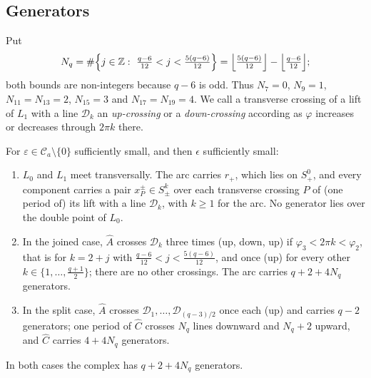 \subsection{Generators}\label{ss:gens-P}

Put
\[
N_q=\#\Bigl\{j\in\Z:\ \tfrac{q-6}{12}<j<\tfrac{5(q-6)}{12}\Bigr\}=\Bigl\lfloor\tfrac{5(q-6)}{12}\Bigr\rfloor-\Bigl\lfloor\tfrac{q-6}{12}\Bigr\rfloor ;
\]
both bounds are non-integers because $q-6$ is odd. Thus $N_7=0$, $N_9=1$, $N_{11}=N_{13}=2$, $N_{15}=3$ and
$N_{17}=N_{19}=4$. We call a transverse crossing of a lift of $L_1$ with a line $\mathcal D_k$ an \emph{up-crossing} or a
\emph{down-crossing} according as $\varphi$ increases or decreases through $2\pi k$ there.

\begin{proposition}\label{prop:gens}
For $\varepsilon\in\mathcal C_a\setminus\{0\}$ sufficiently small, and then $\epsilon$ sufficiently small:
\begin{enumerate}
\item $L_0$ and $L_1$ meet transversally. The arc carries $r_+$, which lies on $S^0_+$, and every component carries a pair
$x_P^\pm\in S^k_\pm$ over each transverse crossing $P$ of (one period of) its lift with a line $\mathcal D_k$, with $k\ge1$ for the
arc. No generator lies over the double point of $L_0$.
\item In the joined case, $\hat A$ crosses $\mathcal D_k$ three times (up, down, up) if $\varphi_3<2\pi k<\varphi_2$, that is for $k=2+j$
with $\frac{q-6}{12}<j<\frac{5(q-6)}{12}$, and once (up) for every other $k\in\{1,\dots,\frac{q+1}2\}$; there are no other
crossings. The arc carries $q+2+4N_q$ generators.
\item In the split case, $\hat A$ crosses $\mathcal D_1,\dots,\mathcal D_{(q-3)/2}$ once each (up) and carries $q-2$ generators; one period
of $\hat C$ crosses $N_q$ lines downward and $N_q+2$ upward, and $\hat C$ carries $4+4N_q$ generators.
\end{enumerate}
In both cases the complex has $q+2+4N_q$ generators.
\end{proposition}

